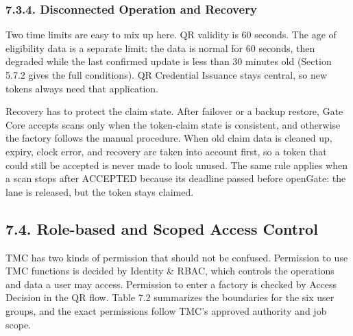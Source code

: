 \subsubsection*{7.3.4. Disconnected Operation and Recovery}

{}

Two time limits are easy to mix up here. QR validity is 60 seconds. The age of eligibility data is a separate limit: the data is normal for 60 seconds, then degraded while the last confirmed update is less than 30 minutes old (Section 5.7.2 gives the full conditions). QR Credential Issuance stays central, so new tokens always need that application.

Recovery has to protect the claim state. After failover or a backup restore, Gate Core accepts scans only when the token-claim state is consistent, and otherwise the factory follows the manual procedure. When old claim data is cleaned up, expiry, clock error, and recovery are taken into account first, so a token that could still be accepted is never made to look unused. The same rule applies when a scan stops after ACCEPTED because its deadline passed before openGate: the lane is released, but the token stays claimed.

\subsection*{7.4. Role-based and Scoped Access Control}

{}

TMC has two kinds of permission that should not be confused. Permission to use TMC functions is decided by Identity \& RBAC, which controls the operations and data a user may access. Permission to enter a factory is checked by Access Decision in the QR flow. Table 7.2 summarizes the boundaries for the six user groups, and the exact permissions follow TMC's approved authority and job scope.

